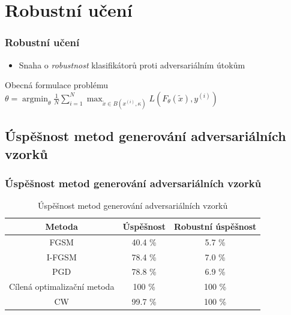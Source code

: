 \documentclass[czech]{beamer}
\begin{document}
\section{Robustní učení}

\begin{frame}
    \frametitle{Robustní učení}
    \begin{itemize}
        \item Snaha o \emph{robustnost} klasifikátorů proti adversariálním útokům
    \end{itemize}

    \begin{block}{Obecná formulace problému}
        \centering
        $\theta = \operatorname{argmin}_\theta \frac{1}{N} \sum_{i=1}^N  \operatorname{max}_{\tilde{x} \in B(x^{(i)}, \kappa)} L\left(F_\theta(\tilde{x}), y^{(i)}\right)$
    \end{block}
\end{frame}



\subsection{Úspěšnost metod generování adversariálních vzorků}

\begin{frame}
    \frametitle{Úspěšnost metod generování adversariálních vzorků}
    \begin{table}
        \centering
        \begin{tabular}{| c | c | c |}
            \hline
            Metoda & Úspěšnost & Robustní úspěšnost\\
            \hline
            FGSM & 40.4 \% & 5.7 \% \\
            I-FGSM & 78.4 \% & 7.0 \% \\
            PGD & 78.8 \% & 6.9 \% \\
            Cílená optimalizační metoda & 100 \% & 100 \% \\
            CW & 99.7 \% & 100 \% \\
            \hline
        \end{tabular}
        \caption{Úspěšnost metod generování adversariálních vzorků}
        \label{allgen_success}
    \end{table}
\end{frame}
\end{document}
